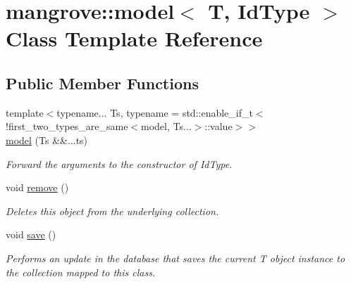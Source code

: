 \hypertarget{classmangrove_1_1model}{}\section{mangrove\+:\+:model$<$ T, Id\+Type $>$ Class Template Reference}
\label{classmangrove_1_1model}
\subsection*{Public Member Functions}
\begin{DoxyCompactItemize}
\item 
{\footnotesize template$<$typename... Ts, typename  = std\+::enable\+\_\+if\+\_\+t$<$!first\+\_\+two\+\_\+types\+\_\+are\+\_\+same$<$model, Ts...$>$\+::value$>$$>$ }\\\hyperlink{classmangrove_1_1model_aad4ed1da2c483620d05c93cdc506e356}{model} (Ts \&\&...ts)
\begin{DoxyCompactList}\small\item\em Forward the arguments to the constructor of Id\+Type. \end{DoxyCompactList}\item 
void \hyperlink{classmangrove_1_1model_a1502c90fc3a7c9664a2578efb63e0371}{remove} ()
\begin{DoxyCompactList}\small\item\em Deletes this object from the underlying collection. \end{DoxyCompactList}\item 
void \hyperlink{classmangrove_1_1model_a0dd3802e09d149f4bfa8661b7992c177}{save} ()
\begin{DoxyCompactList}\small\item\em Performs an update in the database that saves the current T object instance to the collection mapped to this class. \end{DoxyCompactList}\end{DoxyCompactItemize}
